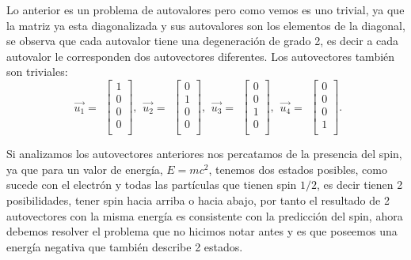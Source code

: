 \documentclass[twocolumn]{article}
\begin{document}
Lo anterior es un problema de autovalores pero como vemos es uno trivial, ya que la matriz ya esta diagonalizada y sus autovalores son los elementos de la diagonal, se observa que cada autovalor tiene una degeneración de grado 2, es decir a cada autovalor le corresponden dos autovectores diferentes. Los autovectores también son triviales:
\begin{equation}
\begin{matrix}
\Vec{u_1}=
\end{matrix}
\begin{bmatrix}
1  \\
0  \\
0  \\
0  \\
\end{bmatrix}
,
\begin{matrix}
\Vec{u_2}=
\end{matrix}
\begin{bmatrix}
0  \\
1  \\
0  \\
0  \\
\end{bmatrix}
,
\begin{matrix}
\Vec{u_3}=
\end{matrix}
\begin{bmatrix}
0  \\
0  \\
1  \\
0  \\
\end{bmatrix}
,
\begin{matrix}
\Vec{u_4}=
\end{matrix}
\begin{bmatrix}
0  \\
0  \\
0  \\
1  \\
\end{bmatrix}
.
\end{equation}

Si analizamos los autovectores anteriores nos percatamos de la presencia del spin, ya que para un valor de energía, $E=mc^2$, tenemos dos estados posibles, como sucede con el electrón y todas las partículas que tienen spin $1/2$, es decir tienen 2 posibilidades, tener spin hacia arriba o hacia abajo, por tanto el resultado de 2 autovectores con la misma energía es consistente con la predicción del spin, ahora debemos resolver el problema que no hicimos notar antes y es que poseemos una energía negativa que también describe 2 estados.
\end{document}
